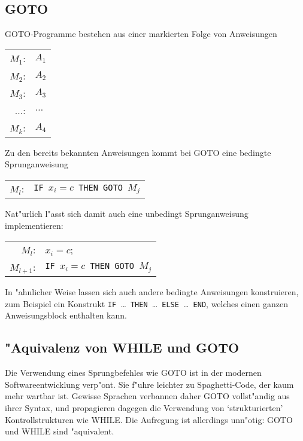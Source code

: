 \subsection{GOTO}
GOTO-Programme bestehen aus einer markierten Folge von Anweisungen
\begin{center}
\begin{tabular}{rl}
$M_1$:&$A_1$\\
$M_2$:&$A_2$\\
$M_3$:&$A_3$\\
$\dots$:&$\dots$\\
$M_k$:&$A_4$
\end{tabular}
\end{center}
Zu den bereits bekannten Anweisungen kommt bei GOTO eine bedingte
Sprunganweisung
\begin{center}
\begin{tabular}{rl}
$M_l$:&{\tt IF\ }$x_i=c${\tt\ THEN GOTO\ }$M_j$
\end{tabular}
\end{center}
Nat"urlich l"asst sich damit auch eine unbedingt Sprunganweisung
implementieren:
\begin{center}
\begin{tabular}{rl}
$M_l$:&$x_i=c$;\\
$M_{l+1}$:&{\tt IF\ }$x_i=c${\tt\ THEN GOTO\ }$M_j$
\end{tabular}
\end{center}
In "ahnlicher Weise lassen sich auch andere bedingte Anweisungen
konstruieren, zum Beispiel ein
Konstrukt {\tt IF }\dots{\tt\ THEN }\dots{\tt\ ELSE }\dots{\tt\ END}, welches
einen ganzen Anweisungsblock enthalten kann.

\subsection{"Aquivalenz von WHILE und GOTO}
Die Verwendung eines Sprungbefehles wie GOTO ist in der modernen
Softwareentwicklung verp"ont. Sie f"uhre leichter zu Spaghetti-Code,
der kaum mehr wartbar ist. Gewisse Sprachen verbannen daher 
GOTO vollst"andig aus ihrer Syntax, und propagieren dagegen
die Verwendung von `strukturierten' Kontrollstrukturen wie
WHILE. Die Aufregung ist allerdings unn"otig: GOTO und WHILE sind "aquivalent.



